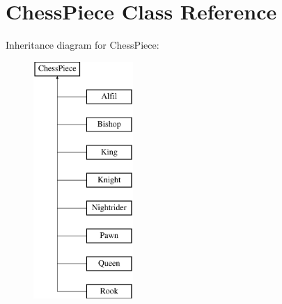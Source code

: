 \hypertarget{class_chess_piece}{}\section{Chess\+Piece Class Reference}
\label{class_chess_piece}
Inheritance diagram for Chess\+Piece\+:\begin{figure}[H]
\begin{center}
\leavevmode
\includegraphics[height=9.000000cm]{class_chess_piece}
\end{center}
\end{figure}
